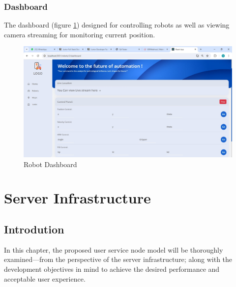     
    \newpage
    
    \subsection{Dashboard}
    
    The dashboard (figure \ref{fig:dashboard}) designed for controlling robots as well as viewing camera streaming for monitoring current position.
    
    \begin{figure}[h!]
    	\centering
    	\includegraphics[scale=0.3]{./Figures/WebApp/Dashboard.jpeg}
    	\caption{Robot Dashboard}
    	\label{fig:dashboard}
    \end{figure}



\newpage

\chapter{Server Infrastructure}

\section{Introdution}
In this chapter, the proposed user service node model will be thoroughly examined---from the perspective of the server infrastructure; along with the development objectives in mind to achieve the desired performance and acceptable user experience.

